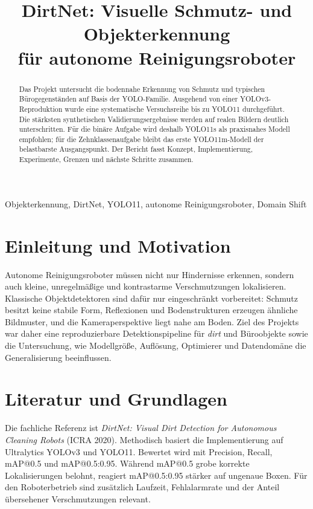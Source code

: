 \documentclass[conference,a4paper]{IEEEtran}
\title{DirtNet: Visuelle Schmutz- und Objekterkennung\\für autonome Reinigungsroboter}
\author{\IEEEauthorblockN{Shufang Tao, Yuxin Song und Yuyang Ren}
\IEEEauthorblockA{Matrikelnummern: 3824652, 3820779 und 3762594}}
\begin{document}
\maketitle
\begin{abstract}
Das Projekt untersucht die bodennahe Erkennung von Schmutz und typischen Bürogegenständen auf Basis der YOLO-Familie. Ausgehend von einer YOLOv3-Reproduktion wurde eine systematische Versuchsreihe bis zu YOLO11 durchgeführt. Die stärksten synthetischen Validierungsergebnisse werden auf realen Bildern deutlich unterschritten. Für die binäre Aufgabe wird deshalb YOLO11s als praxisnahes Modell empfohlen; für die Zehnklassenaufgabe bleibt das erste YOLO11m-Modell der belastbarste Ausgangspunkt. Der Bericht fasst Konzept, Implementierung, Experimente, Grenzen und nächste Schritte zusammen.
\end{abstract}
\begin{IEEEkeywords}
Objekterkennung, DirtNet, YOLO11, autonome Reinigungsroboter, Domain Shift
\end{IEEEkeywords}

\section{Einleitung und Motivation}
Autonome Reinigungsroboter müssen nicht nur Hindernisse erkennen, sondern auch kleine, unregelmäßige und kontrastarme Verschmutzungen lokalisieren. Klassische Objektdetektoren sind dafür nur eingeschränkt vorbereitet: Schmutz besitzt keine stabile Form, Reflexionen und Bodenstrukturen erzeugen ähnliche Bildmuster, und die Kameraperspektive liegt nahe am Boden. Ziel des Projekts war daher eine reproduzierbare Detektionspipeline für \emph{dirt} und Büroobjekte sowie die Untersuchung, wie Modellgröße, Auflösung, Optimierer und Datendomäne die Generalisierung beeinflussen.

\section{Literatur und Grundlagen}
Die fachliche Referenz ist \emph{DirtNet: Visual Dirt Detection for Autonomous Cleaning Robots} (ICRA 2020). Methodisch basiert die Implementierung auf Ultralytics YOLOv3 und YOLO11. Bewertet wird mit Precision, Recall, mAP@0.5 und mAP@0.5:0.95. Während mAP@0.5 grobe korrekte Lokalisierungen belohnt, reagiert mAP@0.5:0.95 stärker auf ungenaue Boxen. Für den Roboterbetrieb sind zusätzlich Laufzeit, Fehlalarmrate und der Anteil übersehener Verschmutzungen relevant.
\end{document}
